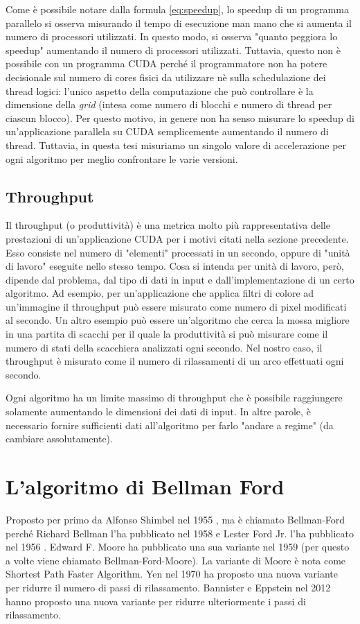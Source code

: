 \documentclass[12pt,a4paper]{book} %
\begin{document}
	Come è possibile notare dalla formula \ref{eq:speedup}, lo speedup di un programma parallelo si osserva misurando il tempo di esecuzione man mano che si aumenta il numero di processori utilizzati. In questo modo, si osserva "quanto peggiora lo speedup" aumentando il numero di processori utilizzati. Tuttavia, questo non è possibile con un programma CUDA perché il programmatore non ha potere decisionale sul numero di cores fisici da utilizzare nè sulla schedulazione dei thread logici: l'unico aspetto della computazione che può controllare è la dimensione della \textit{grid} (intesa come numero di blocchi e numero di thread per ciascun blocco). Per questo motivo, in genere non ha senso misurare lo speedup di un'applicazione parallela su CUDA semplicemente aumentando il numero di thread. Tuttavia, in questa tesi misuriamo un singolo valore di accelerazione per ogni algoritmo per meglio confrontare le varie versioni.
	
	\section{Throughput}
	Il throughput (o produttività) è una metrica molto più rappresentativa delle prestazioni di un'applicazione CUDA per i motivi citati nella sezione precedente. Esso consiste nel numero di "elementi" processati in un secondo, oppure di "unità di lavoro" eseguite nello stesso tempo. Cosa si intenda per unità di lavoro, però, dipende dal problema, dal tipo di dati in input e dall'implementazione di un certo algoritmo. Ad esempio, per un'applicazione che applica filtri di colore ad un'immagine il throughput può essere misurato come numero di pixel modificati al secondo. Un altro esempio può essere un'algoritmo che cerca la mossa migliore in una partita di scacchi per il quale la produttività si può misurare come il numero di stati della scacchiera analizzati ogni secondo. Nel nostro caso, il throughput è misurato come il numero di rilassamenti di un arco effettuati ogni secondo.
	
	Ogni algoritmo ha un limite massimo di throughput che è possibile raggiungere solamente aumentando le dimensioni dei dati di input. In altre parole, è necessario fornire sufficienti dati all'algoritmo per farlo "andare a regime" (da cambiare assolutamente).
	
	\chapter{L'algoritmo di Bellman Ford}
	\label{section:analisi}
	Proposto per primo da Alfonso Shimbel nel 1955 \cite{Shimbel1955}, ma è chiamato Bellman-Ford perché Richard Bellman l'ha pubblicato nel 1958 \cite{Bellman1958} e Lester Ford Jr. l'ha pubblicato nel 1956 \cite{Ford1956}. Edward F. Moore ha pubblicato una sua variante nel 1959 \cite{Moore1959} (per questo a volte viene chiamato Bellman-Ford-Moore). La variante di Moore è nota come Shortest Path Faster Algorithm. Yen nel 1970 \cite{Yen1970} ha proposto una nuova variante per ridurre il numero di passi di rilassamento. Bannister e Eppstein nel 2012 \cite{Bannister2012} hanno proposto una nuova variante per ridurre ulteriormente i passi di rilassamento.
	
\end{document}
